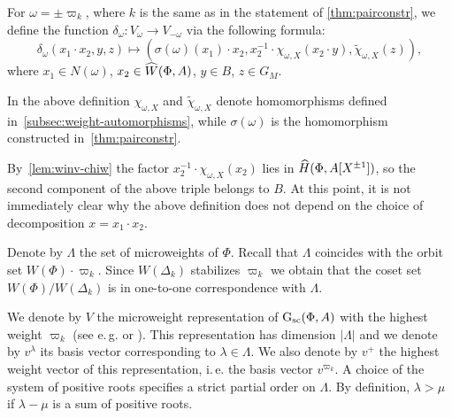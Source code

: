 \begin{dfn} \label{sigma-def}
  For $\omega = \pm \varpi_k$, where $k$ is the same as in the statement of \cref{thm:pairconstr},
  we define the function $\delta_\omega \colon V_\omega \to V_{-\omega}$ via the following formula:
  \begin{equation} \label{eq:sigma-def} \delta_\omega(x_1 \cdot x_2, y, z) \mapsto (\sigma(\omega)(x_1)\cdot x_2, x_2^{-1} \cdot \chi_{\omega, X}(x_2 \cdot y), \widetilde{\chi}_{\omega, X}(z)), \end{equation}
  where $x_1 \in N(\omega)$, $x_2 \in \widehat{W}(\Phi, A)$,  $y \in B$, $z \in G_M$.
\end{dfn}

In the above definition $\chi_{\omega, X}$ and $\widetilde{\chi}_{\omega, X}$ denote homomorphisms defined in~\cref{subsec:weight-automorphisms},
 while $\sigma(\omega)$ is the homomorphism constructed in~\cref{thm:pairconstr}.

By~\cref{lem:winv-chiw} the factor $x_2^{-1} \cdot \chi_{\omega, X}(x_2)$ lies in $\widehat{H}(\Phi, A[X^{\pm 1}])$,
 so the second component of the above triple belongs to $B$.
At this point, it is not immediately clear why the above definition does not depend on the choice of decomposition $x = x_1 \cdot x_2$.

Denote by $\Lambda$ the set of microweights of $\Phi$.
Recall that $\Lambda$ coincides with the orbit set $W(\Phi) \cdot \varpi_k$.
Since $W(\Delta_k)$ stabilizes $\varpi_k$ we obtain that the coset set $W(\Phi)/W(\Delta_k)$ is in one-to-one correspondence with $\Lambda$.

We denote by $V$ the microweight representation of $\operatorname{G}_\mathrm{sc}(\Phi, A)$ with the highest weight $\varpi_k$ (see e.\,g. \cite[\S~2]{Ge17} or \cite[\S~1.1]{V00}).
This representation has dimension $|\Lambda|$ and we denote by $v^\lambda$ its basis vector corresponding to $\lambda \in \Lambda$.
We also denote by $v^+$ the highest weight vector of this representation, i.\,e. the basis vector $v^{\varpi_k}$.
A choice of the system of positive roots specifies a strict partial order on $\Lambda$.
By definition, $\lambda > \mu$ if $\lambda - \mu$ is a sum of positive roots.

